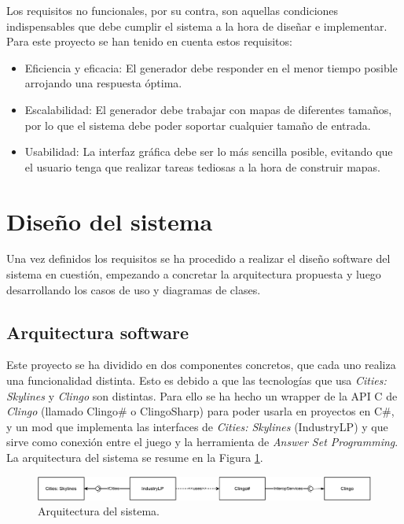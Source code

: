 Los requisitos no funcionales, por su contra, son aquellas condiciones indispensables que debe cumplir el sistema a la hora de diseñar e implementar. Para este proyecto se han tenido en cuenta estos requisitos:

\begin{itemize}
	\item Eficiencia y eficacia: El generador debe responder en el menor tiempo posible arrojando una respuesta óptima.
	\item Escalabilidad: El generador debe trabajar con mapas de diferentes tamaños, por lo que el sistema debe poder soportar cualquier tamaño de entrada.
	\item Usabilidad: La interfaz gráfica debe ser lo más sencilla posible, evitando que el usuario tenga que realizar tareas tediosas a la hora de construir mapas.
\end{itemize}

\section{Diseño del sistema}

Una vez definidos los requisitos se ha procedido a realizar el diseño software del sistema en cuestión, empezando a concretar la arquitectura propuesta y luego desarrollando los casos de uso y diagramas de clases.

\subsection{Arquitectura software}
\label{subsec:arquitectura}

Este proyecto se ha dividido en dos componentes concretos, que cada uno realiza una funcionalidad distinta. Esto es debido a que las tecnologías que usa \textit{Cities: Skylines\textcopyright} y \textit{Clingo} son distintas. Para ello se ha hecho un wrapper de la API C de \textit{Clingo} (llamado Clingo\# o ClingoSharp) para poder usarla en proyectos en C\#, y un mod que implementa las interfaces de \textit{Cities: Skylines\textcopyright} (IndustryLP) y que sirve como conexión entre el juego y la herramienta de \textit{Answer Set Programming}. La arquitectura del sistema se resume en la Figura \ref{fig:arquitectura}. \\

\begin{figure}[!h]
	\centering
	\includegraphics[width=\textwidth]{images/arquitectura.pdf}
	\caption{Arquitectura del sistema.}
	\label{fig:arquitectura}
\end{figure}

